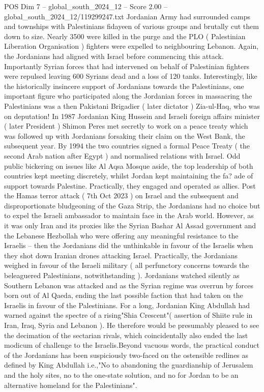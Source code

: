 \begin{textsample}{POS Dim 7 – global\_south\_2024\_12 – Score 2.00 – global\_south\_2024\_12/119299247.txt}
Jordanian Army had surrounded camps and townships with Palestinians fidayeen of various groups and brutally cut them down to size.
Nearly 3500 were killed in the purge and the PLO ( Palestinian Liberation Organisation ) fighters were expelled to neighbouring Lebanon.
Again, the Jordanians had aligned with Israel before commencing this attack.
Importantly Syrian forces that had intervened on behalf of Palestinian fighters were repulsed leaving 600 Syrians dead and a loss of 120 tanks.
Interestingly, like the historically insincere support of Jordanians towards the Palestinians, one important figure who participated along the Jordanian forces in massacring the Palestinians was a then Pakistani Brigadier ( later dictator ) Zia-ul-Haq, who was on deputation!
In 1987 Jordanian King Hussein and Israeli foreign affairs minister ( later President ) Shimon Peres met secretly to work on a peace treaty which was followed up with Jordanians forsaking their claim on the West Bank, the subsequent year.
By 1994 the two countries signed a formal Peace Treaty ( the second Arab nation after Egypt ) and normalised relations with Israel.
Odd public bickering on issues like Al Aqsa Mosque aside, the top leadership of both countries kept meeting discretely, whilst Jordan kept maintaining the fa? ade of support towards Palestine.
Practically, they engaged and operated as allies.
Post the Hamas terror attack ( 7th Oct 2023 ) on Israel and the subsequent and disproportionate bludgeoning of the Gaza Strip, the Jordanians had no choice but to expel the Israeli ambassador to maintain face in the Arab world.
However, as it was only Iran and its proxies like the Syrian Bashar Al Assad government and the Lebanese Hezbollah who were offering any meaningful resistance to the Israelis -- then the Jordanians did the unthinkable in favour of the Israelis when they shot down Iranian drones attacking Israel.
Practically, the Jordanians weighed in favour of the Israeli military ( all perfunctory concerns towards the beleaguered Palestinians, notwithstanding ).
Jordanians watched silently as Southern Lebanon was attacked and as the Syrian regime was overrun by forces born out of Al Qaeda, ending the last possible faction that had taken on the Israelis in favour of the Palestinians.
For a long, Jordanian King Abdullah had warned against the spectre of a rising"Shia Crescent"( assertion of Shiite rule in Iran, Iraq, Syria and Lebanon ).
He therefore would be presumably pleased to see the decimation of the sectarian rivals, which coincidentally also ended the last modicum of challenge to the Israelis.Beyond vacuous words, the practical conduct of the Jordanians has been suspiciously two-faced on the ostensible redlines as defined by King Abdullah i.e.,"No to abandoning the guardianship of Jerusalem and the holy sites, no to the one-state solution, and no for Jordan to be an alternative homeland for the Palestinians".

\end{textsample}
